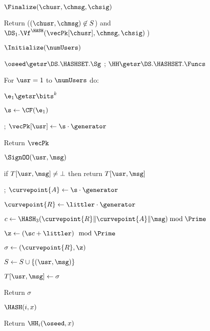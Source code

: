 \begin{figure}
{		\begin{oracle}{$\Finalize(\chusr, \chmsg, \chsig)$}
			\item Return ($(\chusr,\chmsg) \not\in S$) and $\DS_1.\Vf^{\HASH}(\vecPk[\chusr], \chmsg, \chsig)\:$) \vspace{2pt}
		\end{oracle}
	}
	{	
		
		\begin{oracle}{$\Initialize(\numUsers)$}
			\item $\oseed\getsr\DS.\HASHSET.\Sg$ ; 
			$\HH \getsr \DS.\HASHSET.\Funcs$
			\item For $\usr=1$ to $\numUsers$ do:
			\item \quad $\e_1\getsr \bits^{k}$
			\item \quad $\s \gets \CF(\e_1)$ 
			\item\quad \gamechange{$\vecSk[\usr]\gets \s$}; $\vecPk[\usr] \gets \s\cdot \generator$
			\item Return $\vecPk$
		\end{oracle}
		\ExptSepSpace
		
		\begin{oracle}{$\SignOO(\usr, \msg)$}
			\item if $T[\usr, \msg] \neq \bot$ then return $T[\usr, \msg]$
			\item \gamechange{$\s \gets \vecSk[\usr]$}; $\curvepoint{A} \gets \s\cdot \generator$
			\item \gamechange{$\littler \getsr \Z_\Prime$}
			\item $\curvepoint{R} \gets \littler\cdot \generator$
			\item $c \gets \HASH_3(\curvepoint{R}\|\curvepoint{A}\|\msg) \bmod \Prime$
			\item $\z \gets (\s c + \littler) \mod \Prime$
			\item $\sigma \gets (\curvepoint{R},\z)$
			\item $S \gets S \cup \{(\usr, \msg)\}$
			\item $T[\usr, \msg] \gets \sigma$
			\item Return $\sigma$
		\end{oracle}
		\ExptSepSpace
		
		\begin{oracle}{$\HASH(i,x)$}
			\item Return $\HH_i(\oseed,x)$
		\end{oracle}
		\ExptSepSpace
		
}
\end{figure}
